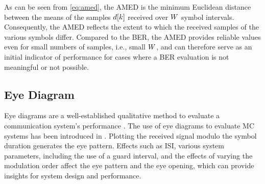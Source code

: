 As can be seen from \eqref{eq:amed}, the \ac{AMED} is the minimum Euclidean distance between the means of the samples $d[k]$ received over $W$ symbol intervals. Consequently, the \ac{AMED} reflects the extent to which the received samples of the various symbols differ. Compared to the \ac{BER}, the \ac{AMED} provides reliable values even for small numbers of samples, i.e., small $W$, and can therefore serve as an initial indicator of performance for cases where a \ac{BER} evaluation is not meaningful or not possible.
\vspace{0.1cm}
\scaleSubsection
\subsection{Eye Diagram}
\scaleSubsectionBelow
Eye diagrams are a well-established qualitative method to evaluate a communication system's performance \cite[p. 603]{proakis2008digital}. The use of eye diagrams to evaluate \ac{MC} systems has been introduced in \cite{farsad2017novel}. Plotting the received signal modulo the symbol duration generates the eye pattern. Effects such as \ac{ISI}, various system parameters, including the use of a guard interval, and the effects of varying the modulation order affect the eye pattern and the eye opening, which can provide insights for system design and performance.

